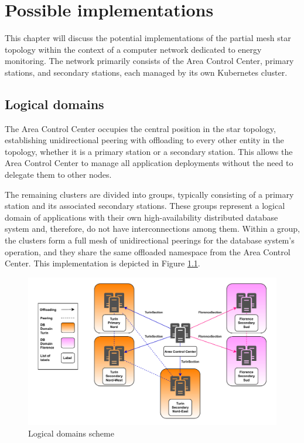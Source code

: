 \chapter{Possible implementations}
This chapter will discuss the potential implementations of the partial mesh star topology within the context of a computer network dedicated to energy monitoring. The network primarily consists of the Area Control Center, primary stations, and secondary stations, each managed by its own Kubernetes cluster.

\section{Logical domains}
The Area Control Center occupies the central position in the star topology, establishing unidirectional peering with offloading to every other entity in the topology, whether it is a primary station or a secondary station. This allows the Area Control Center to manage all application deployments without the need to delegate them to other nodes.

The remaining clusters are divided into groups, typically consisting of a primary station and its associated secondary stations. These groups represent a logical domain of applications with their own high-availability distributed database system and, therefore, do not have interconnections among them. Within a group, the clusters form a full mesh of unidirectional peerings for the database system's operation, and they share the same offloaded namespace from the Area Control Center. This implementation is depicted in Figure \ref{fig:domains}.

\begin{figure}[ht]\centering
\includegraphics[scale=0.7]{Pictures/Domain-v3}
\caption{Logical domains scheme}\label{fig:domains}
\end{figure}

